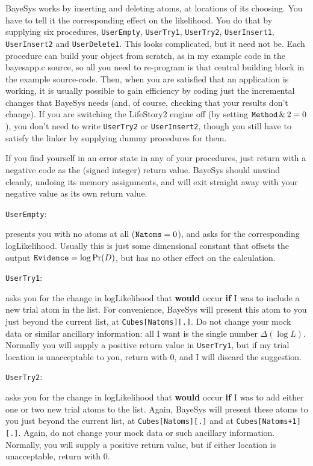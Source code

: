 \vfill\eject
{}
\bigskip

BayeSys works by inserting and deleting atoms, at locations of its choosing. 
You have to tell it the corresponding effect on the likelihood.  
You do that by supplying six procedures, {\tt UserEmpty}, {\tt UserTry1}, {\tt UserTry2}, {\tt UserInsert1}, {\tt UserInsert2} and {\tt UserDelete1}.  
This looks complicated, but it need not be.
Each procedure can build your object from scratch, as in my example code in the bayesapp.c source, 
so all you need to re-program is that central building block in the example source-code.  
Then, when you are satisfied that an application is working, it is usually possible to gain efficiency by coding just the incremental changes that BayeSys needs
(and, of course, checking that your results don't change).
If you are switching the LifeStory2 engine off (by setting ${\tt Method}\,\&\,2 = 0$), 
you don't need to write {\tt UserTry2} or {\tt UserInsert2}, though you still have to satisfy the linker by supplying dummy procedures for them.
 
If you find yourself in an error state in any of your procedures, just return with a negative code as the (signed integer) return value.  
BayeSys should unwind cleanly, undoing its memory assignments, and will exit straight away with your negative value as its own return value.

\medskip
{\tt UserEmpty}:

 presents you with no atoms at all (${\tt Natoms}=0$), and asks for the corresponding logLikelihood.  
Usually this is just some dimensional constant that offsets the output ${\tt Evidence} = \log \Pr(D)$, but has no other effect on the calculation.


\medskip
{\tt UserTry1}:

 asks you for the change in logLikelihood that {\bf would} occur {\bf if} I was to include a new trial atom in the list.  
For convenience, BayeSys will present this atom to you just beyond the current list, at {\tt Cubes[Natoms][.]}.  
Do not change your mock data or similar ancillary information: all I want is the single number $\Delta(\log L)$.  
Normally you will supply a positive return value in {\tt UserTry1}, but if my trial location is unacceptable to you, return with 0, and I will discard the suggestion.
 

\medskip
{\tt UserTry2}:

 asks you for the change in logLikelihood that {\bf would} occur {\bf if} I was to add either one or two new trial atoms to the list.  
Again, BayeSys will present these atoms to you just beyond the current list, at {\tt Cubes[Natoms][.]} and at {\tt Cubes[Natoms+1][.]}.  
Again, do not change your mock data or such ancillary information.  
Normally, you will supply a positive return value, but if either location is unacceptable, return with 0.


